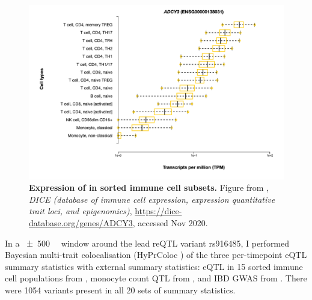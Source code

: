 \begin{figure}
    \centering
    \includegraphics[width=1.0\textwidth,page=1]{mainmatter/figures/chapter_03/ADCY3_expression.png}
    \caption[
    ]{
        \textbf{Expression of  in sorted immune cell subsets.}
        Figure from \textcite{schmiedel2018ImpactGeneticPolymorphisms}, 
        \textit{DICE (database of immune cell expression, expression quantitative trait loci, and epigenomics)}, 
        \url{https://dice-database.org/genes/ADCY3}, accessed Nov 2020.
    }
    \label{fig:hird_reQTL_ADCY3_expression_DICE}
\end{figure}

In a \SI{\pm 500}{\mega\bp} window around the lead \gls{reQTL} variant rs916485,
I performed Bayesian multi-trait colocalisation ({HyPrColoc} \autocite{foley2019FastEfficientColocalization}) of
the three per-timepoint  \gls{eQTL} summary statistics with external summary statistics: 
 \gls{eQTL} in 15 sorted immune cell populations from \textcite{schmiedel2018ImpactGeneticPolymorphisms},
monocyte count \gls{QTL} from \textcite{astle2016AllelicLandscapeHuman},
and \gls{IBD} \gls{GWAS} from \textcite{delange2017GenomewideAssociationStudy}.
There were 1054 variants present in all 20 sets of summary statistics.

